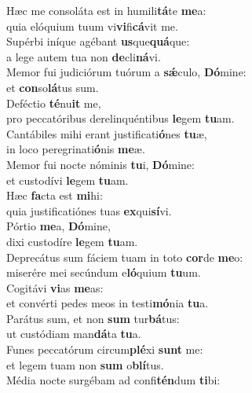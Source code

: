 \evenverse Hæc me consoláta est in humili\textbf{tá}te \textbf{me}a:~\*\\
\evenverse quia elóquium tuum vi\textbf{vi}fi\textbf{cá}vit me.\\
\oddverse Supérbi iníque agébant \textbf{us}que\textbf{quá}que:~\*\\
\oddverse a lege autem tua non \textbf{de}cli\textbf{ná}vi.\\
\evenverse Memor fui judiciórum tuórum a \textbf{sǽ}culo, \textbf{Dó}mine:~\*\\
\evenverse et \textbf{con}so\textbf{lá}tus sum.\\
\oddverse Deféctio \textbf{té}nu\textbf{it} me,~\*\\
\oddverse pro peccatóribus derelinquéntibus \textbf{le}gem \textbf{tu}am.\\
\evenverse Cantábiles mihi erant justificati\textbf{ó}nes \textbf{tu}æ,~\*\\
\evenverse in loco peregrinati\textbf{ó}nis \textbf{me}æ.\\
\oddverse Memor fui nocte nóminis \textbf{tu}i, \textbf{Dó}mine:~\*\\
\oddverse et custodívi \textbf{le}gem \textbf{tu}am.\\
\evenverse Hæc \textbf{fa}cta est \textbf{mi}hi:~\*\\
\evenverse quia justificatiónes tuas \textbf{ex}qui\textbf{sí}vi.\\
\oddverse Pórtio \textbf{me}a, \textbf{Dó}mine,~\*\\
\oddverse dixi custodíre \textbf{le}gem \textbf{tu}am.\\
\evenverse Deprecátus sum fáciem tuam in toto \textbf{cor}de \textbf{me}o:~\*\\
\evenverse miserére mei secúndum e\textbf{ló}quium \textbf{tu}um.\\
\oddverse Cogitávi \textbf{vi}as \textbf{me}as:~\*\\
\oddverse et convérti pedes meos in testi\textbf{mó}nia \textbf{tu}a.\\
\evenverse Parátus sum, et non \textbf{sum} tur\textbf{bá}tus:~\*\\
\evenverse ut custódiam man\textbf{dá}ta \textbf{tu}a.\\
\oddverse Funes peccatórum circum\textbf{plé}xi \textbf{sunt} me:~\*\\
\oddverse et legem tuam non \textbf{sum} o\textbf{blí}tus.\\
\evenverse Média nocte surgébam ad confi\textbf{tén}dum \textbf{ti}bi:~\*\\
